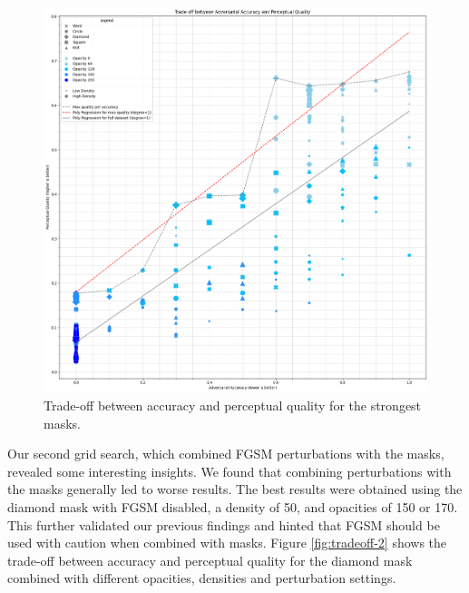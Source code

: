 \documentclass[a4paper, oneside]{discothesis}
\begin{document}
\begin{figure}
	\centering
	\includegraphics[width=1\columnwidth]{figures/tradeoff-1.png}
	\caption{Trade-off between accuracy and perceptual quality for the strongest masks.}
	\label{fig:tradeoff-1}
\end{figure}

Our second grid search, which combined FGSM perturbations with the masks, revealed some interesting insights. We found that combining perturbations with the masks generally led to worse results. The best results were obtained using the diamond mask with FGSM disabled, a density of 50, and opacities of 150 or 170. This further validated our previous findings and hinted that FGSM should be used with caution when combined with masks. Figure \ref{fig:tradeoff-2} shows the trade-off between accuracy and perceptual quality for the diamond mask combined with different opacities, densities and perturbation settings.
\end{document}
